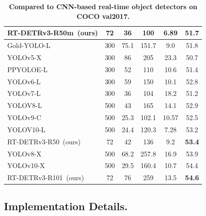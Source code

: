 \documentclass[10pt,twocolumn,letterpaper]{article}
\begin{document}
\begin{table}[t]
\begin{tabular}{l|cccc|c}
\rowcolor[HTML]{ECF4FF} RT-DETRv3-R50m~(ours) & 72        & 36           & 100    & 6.89         & \textbf{51.7} \\ \hline
Gold-YOLO-L~\cite{wang2024gold-yolo}          & 300       & 75.1         & 151.7  & 9.0          & 51.8          \\
YOLOv5-X~\cite{jocher2022yolov5}              & 300       & 86           & 205    & 23.3         & 50.7          \\
PPYOLOE-L~\cite{xu2022ppyoloe}                & 300       & 52           & 110    & 10.6         & 51.4          \\
YOLOv6-L~\cite{li2022yolov6}                  & 300       & 59           & 150    & 10.1         & 52.8          \\
YOLOv7-L                                      & 300       & 36           & 104    & 18.2         & 51.2          \\
YOLOV8-L~\cite{yolov8}                        & 500       & 43           & 165    & 14.1         & 52.9          \\
YOLOv9-C~\cite{wang2024yolov9}                & 500       & 25.3         & 102.1  & 10.57        & 52.5          \\
YOLOV10-L~\cite{wang2024yolov10}              & 500       & 24.4         & 120.3  & 7.28         & 53.2          \\
\rowcolor[HTML]{ECF4FF} RT-DETRv3-R50~(ours)  & 72        & 42           & 136    & 9.2          & \textbf{53.4} \\ \hline
YOLOv8-X~\cite{yolov8}                        & 500       & 68.2         & 257.8  & 16.9         & 53.9          \\
YOLOv10-X~\cite{wang2024yolov10}              & 500       & 29.5         & 160.4  & 10.7         & 54.4          \\
\rowcolor[HTML]{ECF4FF} RT-DETRv3-R101~(ours) & 72        & 76           & 259    & 13.5         & \textbf{54.6} \\ \hline
\end{tabular}
\caption{\textbf{Compared to CNN-based real-time object detectors on COCO val2017.}}
\label{performance based on cnn}
\end{table}

\subsection{Implementation Details.}
\end{document}
